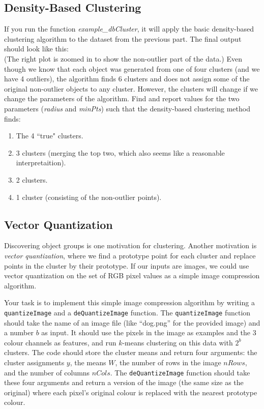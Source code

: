 \documentclass{article}
\def\blu#1{{\color{blu}#1}}
\newcommand{\fig}[2]{\texttt{[image: a2f/\#2]}}
\def\enum#1{\begin{enumerate}#1\end{enumerate}}
\begin{document}
\subsection{Density-Based Clustering}

If you run the function \emph{example\_dbCluster}, it will apply the basic density-based clustering algorithm to the dataset from the previous part. The final output should look like this:\\
(The right plot is zoomed in to show the non-outlier part of the data.)
Even though we know that each object was generated from one of four clusters (and we have 4 outliers), the algorithm finds 6 clusters and does not assign some of the original non-outlier objects to any cluster. However, the clusters will change if we change the parameters of the algorithm. Find and report values for the two parameters (\emph{radius} and \emph{minPts}) such that the density-based clustering method finds:
\blu{\enum{
\item The 4 ``true" clusters.
\item 3 clusters (merging the top two, which also seems like a reasonable interpretaition).
\item 2 clusters.
\item 1 cluster (consisting of the non-outlier points).
}
}

\subsection{Vector Quantization}


Discovering object groups is one motivation for clustering. Another motivation is \emph{vector quantization}, where we find a prototype point for each cluster and replace points in the cluster by their prototype. If our inputs are images, we could use vector quantization on the set of RGB pixel values as a simple image compression algorithm.

Your task is to implement this simple image compression algorithm by writing a \texttt{quantizeImage} and a \texttt{deQuantizeImage} function. The \texttt{quantizeImage} function should take the name of an image file (like ``dog.png'' for the provided image) and a number $b$ as input. It should use the pixels in the image as examples and the 3 colour channels as features, and run $k$-means clustering on this data with $2^b$ clusters. The code should store the cluster means and return four arguments: the cluster assignments $y$, the means $W$, the number of rows in the image $nRows$, and the number of columns $nCols$. The \texttt{deQuantizeImage} function should take these four arguments and return a version of the image (the same size as the original) where each pixel's original colour is replaced with the nearest prototype colour. 
\end{document}
